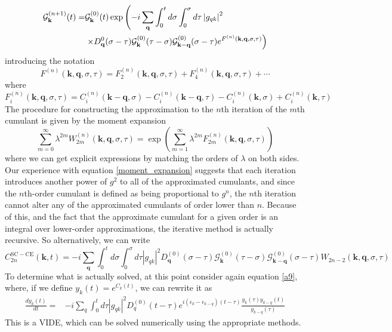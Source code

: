 \begin{align}
    \mathcal{G}_{\mathbf{k}}^{(n+1)}(t)= & \mathcal{G}_{\mathbf{k}}^{(0)}(t) \exp \left(-i \sum_{\mathbf{q}} \int_0^t d \sigma \int_0^\sigma d \tau\left|g_{q k}\right|^2\right. \\
& \left.\times D_{\mathbf{q}}^0(\sigma-\tau) \mathcal{G}_{\mathbf{k}}^{(0)}(\tau-\sigma) \mathcal{G}_{\mathbf{k}-\mathbf{q}}^{(0)}(\sigma-\tau) e^{F^{(n)}(\mathbf{k}, \mathbf{q}, \sigma, \tau)}\right) \notag
\end{align}
introducing the notation 
\begin{equation}
    F^{(n)}(\mathbf{k}, \mathbf{q}, \sigma, \tau) = F_2^{(n)}(\mathbf{k}, \mathbf{q}, \sigma, \tau)+F_4^{(n)}(\mathbf{k}, \mathbf{q}, \sigma, \tau)+\cdots
\end{equation}
where
\begin{equation}
    F_i^{(n)}(\mathbf{k}, \mathbf{q}, \sigma, \tau) = C_i^{(n)}(\mathbf{k}-\mathbf{q}, \sigma)-C_i^{(n)}(\mathbf{k}-\mathbf{q}, \tau) -C_i^{(n)}(\mathbf{k}, \sigma)+C_i^{(n)}(\mathbf{k}, \tau)
\end{equation}
The procedure for constructing the approximation to the $n$th iteration of the $m$th cumulant is given by the moment expansion
\begin{equation}
    \sum_{m=0}^{\infty} \lambda^{2 m} W_{2 m}^{(n)}(\mathbf{k}, \mathbf{q}, \sigma, \tau)=\exp \left(\sum_{m=1}^{\infty} \lambda^{2 m} F_{2 m}^{(n)}(\mathbf{k}, \mathbf{q}, \sigma, \tau)\right)
\end{equation}
where we can get explicit expressions by matching the orders of $\lambda$ on both sides.
Our experience with equation \eqref{moment_expansion} suggests that each iteration introduces another power of $g^2$ to all of the approximated cumulants, and since the $n$th-order cumulant is defined as being proportional to $g^n$, the $n$th iteration cannot alter any of the approximated cumulants of order lower than $n$. Because of this, and the fact that the approximate cumulant for a given order is an integral over lower-order approximations, the iterative method is actually recursive. So alternatively, we can write
\begin{equation}
    C_{2 n}^{\mathrm{SC}-\mathrm{CE}}(\mathbf{k}, t)= -i \sum_{\mathbf{q}} \int_0^t d \sigma \int_0^\sigma d \tau\left|g_{q k}\right|^2 D_{\mathbf{q}}^{(0)}(\sigma-\tau) \mathcal{G}_{\mathbf{k}}^{(0)}(\tau-\sigma) \mathcal{G}_{\mathbf{k}-\mathbf{q}}^{(0)}(\sigma-\tau) W_{2 n-2}(\mathbf{k}, \mathbf{q}, \sigma, \tau)
\end{equation}
To determine what is actually solved, at this point consider again equation \eqref{a9}, where, if we define $y_k(t)=e^{C_k(t)}$, we can rewrite it as
\begin{align}
\frac{d y_k(t)}{d t}= & -i \sum_q \int_0^t d \tau\left|g_{q k}\right|^2 D_q^{(0)}(t-\tau) e^{i(\epsilon_k-\epsilon_{k-q})(t-\tau)} \frac{y_k(\tau) y_{k-q}(t)}{y_{k-q}(\tau)} \label{C1}
\end{align}
This is a VIDE, which can be solved numerically using the appropriate methods.
